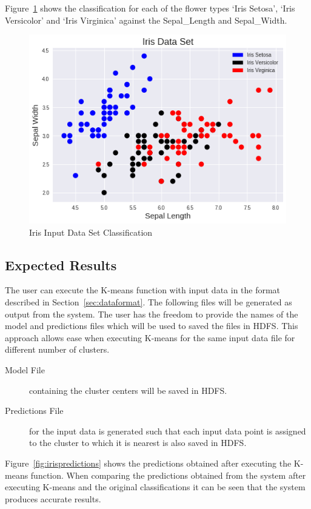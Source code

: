 Figure~\ref{fig:irisinputdata} shows the classification for each of the 
flower types `Iris Setosa', `Iris Versicolor' and `Iris Virginica' against the 
Sepal\_Length and Sepal\_Width.

\begin{figure}[htbp] 
	\centering
	\includegraphics[width=0.8\columnwidth]{images/irisinputdata.png}
	\caption{Iris Input Data Set Classification}
\label{fig:irisinputdata} 
\end{figure}

\subsection{Expected Results}

The user can execute the K-means function with input data in the format 
described in Section~\ref{sec:dataformat}. The following files will be 
generated as output from the system. The user has the freedom to provide the 
names of the model and predictions files which will be used to saved the files 
in HDFS. This approach allows ease when executing K-means for the same input 
data file for different number of clusters.

\begin{description}
	\item[Model File] containing the cluster centers will be saved in HDFS.
	\item[Predictions File] for the input data is 
	generated such that each input data point is assigned to the cluster to 
	which it is nearest is also saved in HDFS.
\end{description}

Figure~\ref{fig:irispredictions} shows the predictions obtained after 
executing the K-means function. When comparing the predictions obtained from 
the system after executing K-means and the original classifications it can be 
seen that the system produces accurate results.

